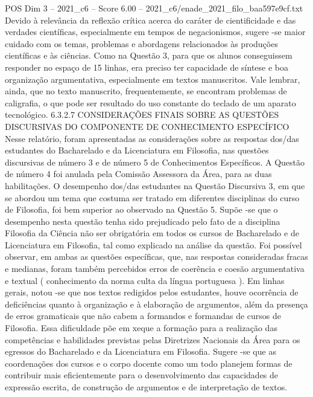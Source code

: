\begin{textsample}{POS Dim 3 – 2021\_c6 – Score 6.00 – 2021\_c6/enade\_2021\_filo\_baa597e9cf.txt}
Devido à relevância da reflexão crítica acerca do caráter de cientificidade e das verdades científicas, especialmente em tempos de negacionismos, sugere -se maior cuidado com os temas, problemas e abordagens relacionados às produções científicas e às ciências.
Como na Questão 3, para que os alunos conseguissem responder no espaço de 15 linhas, era preciso ter capacidade de síntese e boa organização argumentativa, especialmente em textos manuscritos.
Vale lembrar, ainda, que no texto manuscrito, frequentemente, se encontram problemas de caligrafia, o que pode ser resultado do uso constante do teclado de um aparato tecnológico. 6.3.2.7 CONSIDERAÇÕES FINAIS SOBRE AS QUESTÕES DISCURSIVAS DO COMPONENTE DE CONHECIMENTO ESPECÍFICO Nesse relatório, foram apresentadas as considerações sobre as respostas dos/das estudantes do Bacharelado e da Licenciatura em Filosofia, nas questões discursivas de número 3 e de número 5 de Conhecimentos Específicos.
A Questão de número 4 foi anulada pela Comissão Assessora da Área, para as duas habilitações.
O desempenho dos/das estudantes na Questão Discursiva 3, em que se abordou um tema que costuma ser tratado em diferentes disciplinas do curso de Filosofia, foi bem superior ao observado na Questão 5.
Supõe -se que o desempenho nesta questão tenha sido prejudicado pelo fato de a disciplina Filosofia da Ciência não ser obrigatória em todos os cursos de Bacharelado e de Licenciatura em Filosofia, tal como explicado na análise da questão.
Foi possível observar, em ambas as questões específicas, que, nas respostas consideradas fracas e medianas, foram também percebidos erros de coerência e coesão argumentativa e textual ( conhecimento da norma culta da língua portuguesa ).
Em linhas gerais, notou -se que nos textos redigidos pelos estudantes, houve ocorrência de deficiências quanto à organização e à elaboração de argumentos, além da presença de erros gramaticais que não cabem a formandos e formandas de cursos de Filosofia.
Essa dificuldade põe em xeque a formação para a realização das competências e habilidades previstas pelas Diretrizes Nacionais da Área para os egressos do Bacharelado e da Licenciatura em Filosofia.
Sugere -se que as coordenações dos cursos e o corpo docente como um todo planejem formas de contribuir mais eficientemente para o desenvolvimento das capacidades de expressão escrita, de construção de argumentos e de interpretação de textos.

\end{textsample}
